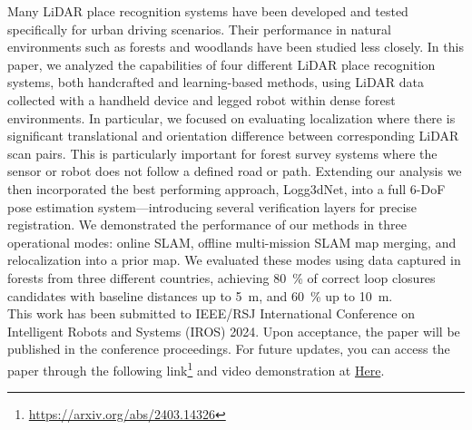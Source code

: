 
Many LiDAR place recognition systems have been developed and tested specifically for urban driving scenarios. Their performance in natural environments such as forests and woodlands have been studied less closely.
In this paper, we analyzed the capabilities of four different LiDAR place recognition systems, both handcrafted and learning-based methods, using LiDAR data collected with a handheld device and legged robot within dense forest environments. 
In particular, we focused on evaluating localization where there is significant translational and orientation difference between corresponding LiDAR scan pairs. This is particularly important for forest survey systems where the sensor or robot does not follow a defined road or path. 
Extending our analysis we then incorporated the best performing approach, Logg3dNet, into a full 6-DoF pose estimation system---introducing several verification layers for precise registration. 
We demonstrated the performance of our methods in three operational modes: online SLAM, offline multi-mission SLAM map merging, and relocalization into a prior map. 
We evaluated these modes using data captured in forests from three different countries, achieving \SI{80}{\percent} of correct loop closures candidates with baseline distances up to \SI{5}{\meter}, and \SI{60}{\percent} up to \SI{10}{\meter}.  \\

This work has been submitted to IEEE/RSJ International Conference on Intelligent Robots and Systems (IROS) 2024. Upon acceptance, the paper will be published in the conference proceedings. For future updates, you can access the paper through the following link\footnote{\url{https://arxiv.org/abs/2403.14326}} and video demonstration at \url{Here}.